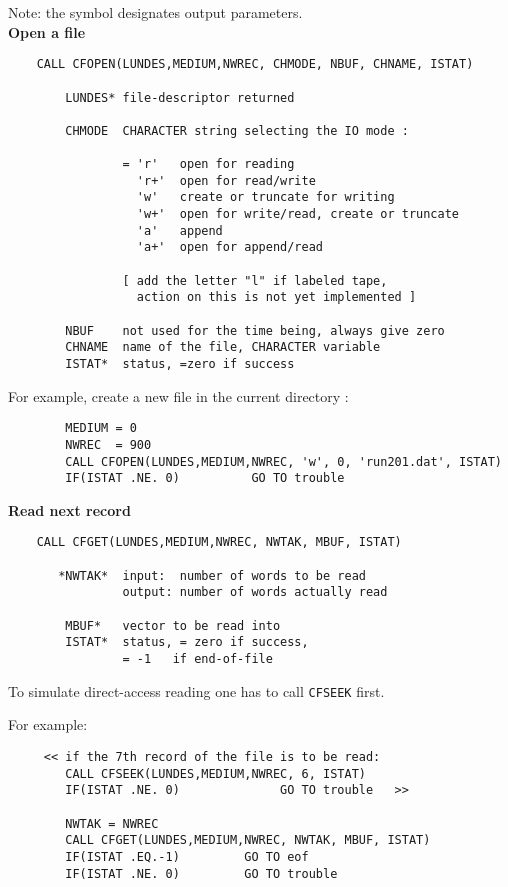 \Usage
Note: the symbol {\tt *} designates output parameters. \\[2mm]
\newpage
{\bf Open a file}
\begin{verbatim}
    CALL CFOPEN(LUNDES,MEDIUM,NWREC, CHMODE, NBUF, CHNAME, ISTAT)
 
        LUNDES* file-descriptor returned
 
        CHMODE  CHARACTER string selecting the IO mode :
 
                = 'r'   open for reading
                  'r+'  open for read/write
                  'w'   create or truncate for writing
                  'w+'  open for write/read, create or truncate
                  'a'   append
                  'a+'  open for append/read
 
                [ add the letter "l" if labeled tape,
                  action on this is not yet implemented ]
 
        NBUF    not used for the time being, always give zero
        CHNAME  name of the file, CHARACTER variable
        ISTAT*  status, =zero if success
\end{verbatim}
   For example, create a new file in the current directory :
\begin{verbatim}
        MEDIUM = 0
        NWREC  = 900
        CALL CFOPEN(LUNDES,MEDIUM,NWREC, 'w', 0, 'run201.dat', ISTAT)
        IF(ISTAT .NE. 0)          GO TO trouble
\end{verbatim}
 
{\bf Read next record}
\begin{verbatim}
    CALL CFGET(LUNDES,MEDIUM,NWREC, NWTAK, MBUF, ISTAT)
 
       *NWTAK*  input:  number of words to be read
                output: number of words actually read
 
        MBUF*   vector to be read into
        ISTAT*  status, = zero if success,
                = -1   if end-of-file
\end{verbatim}
   To simulate direct-access reading one has to call {\tt CFSEEK} first.
 
   For example:
\begin{verbatim}
     << if the 7th record of the file is to be read:
        CALL CFSEEK(LUNDES,MEDIUM,NWREC, 6, ISTAT)
        IF(ISTAT .NE. 0)              GO TO trouble   >>
 
        NWTAK = NWREC
        CALL CFGET(LUNDES,MEDIUM,NWREC, NWTAK, MBUF, ISTAT)
        IF(ISTAT .EQ.-1)         GO TO eof
        IF(ISTAT .NE. 0)         GO TO trouble
\end{verbatim}
 
